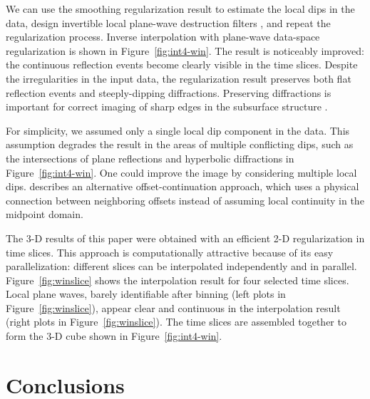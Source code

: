 
We can use the smoothing regularization result to estimate the local
dips in the data, design invertible local plane-wave destruction
filters \cite[]{Fomel.sepphd.107}, and repeat the regularization process.  Inverse
interpolation with plane-wave data-space regularization is shown in
Figure~\ref{fig:int4-win}. The result is noticeably
improved: the continuous reflection events become clearly visible in
the time slices.  Despite the irregularities in the input data, the
regularization result preserves both flat reflection events and
steeply-dipping diffractions. Preserving diffractions is important for
correct imaging of sharp edges in the subsurface structure
\cite[]{GEO63-02-05740588}.

For simplicity, we assumed only a single local dip component in the
data. This assumption degrades the result in the areas of multiple
conflicting dips, such as the intersections of plane reflections and
hyperbolic diffractions in Figure~\ref{fig:int4-win}. One could
improve the image by considering multiple local dips.
\cite{ofcon2} describes an alternative offset-continuation
approach, which uses a physical connection between neighboring offsets
instead of assuming local continuity in the midpoint domain.


The 3-D results of this paper were obtained with an efficient 2-D
regularization in time slices. This approach is computationally
attractive because of its easy parallelization: different slices can
be interpolated independently and in parallel.
Figure~\ref{fig:winslice} shows the interpolation result for four
selected time slices. Local plane waves, barely identifiable after
binning (left plots in Figure~\ref{fig:winslice}), appear clear and
continuous in the interpolation result (right plots in
Figure~\ref{fig:winslice}). The time slices are assembled
together to form the 3-D cube shown in Figure~\ref{fig:int4-win}.


\section{Conclusions}

